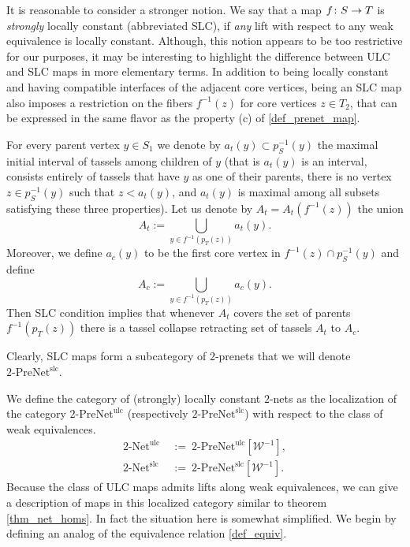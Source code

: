 \documentclass[letterpaper,12pt,leqno]{article}
\numberwithin{equation}{theorem}
\def\cW{\mathcal{W}}
\def\Net{\textrm{-}\mathrm{Net}}
\def\PreNet{\textrm{-}\mathrm{PreNet}}
\def\slc{\mathrm{slc}}
\def\ulc{\mathrm{ulc}}
\begin{document}
\begin{remark}
It is reasonable to consider a stronger notion. We say that a map $f\colon S \to T$ is {\em strongly} locally constant (abbreviated SLC), if {\em any} lift with respect to any weak equivalence
is locally constant. Although, this notion appears to be too restrictive for our purposes, it may be interesting to highlight the difference between ULC and SLC maps in more elementary terms.
In addition to being locally constant and having compatible interfaces of the adjacent core vertices, being an SLC map also imposes a restriction on the fibers $f^{-1}(z)$ for core vertices
$z \in T_2$, that can be expressed in the same flavor as the property (c) of \ref{def_prenet_map}.

For every parent vertex $y \in S_1$ we denote by $a_t(y) \subset p_S^{-1}(y)$ the maximal initial interval of tassels among children of $y$ (that is $a_t(y)$ is an interval, consists entirely
of tassels that have $y$ as one of their parents, there is no vertex $z \in p_S^{-1}(y)$ such that $z < a_t(y)$, and $a_t(y)$ is maximal among all subsets satisfying these three properties).
Let us denote by $A_t = A_t(f^{-1}(z))$ the union
$$
A_t := \bigcup_{y \in f^{-1}(p_T(z))} a_t(y).
$$
Moreover, we define $a_c(y)$ to be the first core vertex in $f^{-1}(z) \cap p_S^{-1}(y)$ and define
$$
A_c := \bigcup_{y \in f^{-1}(p_T(z))} a_c(y).
$$
Then SLC condition implies that whenever $A_t$ covers the set of parents $f^{-1}(p_T(z))$ there is a tassel collapse retracting set of tassels $A_t$ to $A_c$.

Clearly, SLC maps form a subcategory of $2$-prenets that we will denote $2\PreNet^\slc$.

\end{remark}

\begin{nparagraph}
We define the category of (strongly) locally constant $2$-nets as the localization of the category $2\PreNet^\ulc$ (respectively $2\PreNet^\slc$) with respect to the class of weak equivalences.
\begin{align*}
2\Net^\ulc \ &:=\ 2\PreNet^\ulc[\cW^{-1}], \\
2\Net^\slc \ &:=\ 2\PreNet^\slc[\cW^{-1}].
\end{align*}
Because the class of ULC maps admits lifts along weak equivalences, we can give a description of maps in this localized category similar to theorem \ref{thm_net_homs}. In fact
the situation here is somewhat simplified. We begin by defining an analog of the equivalence relation \ref{def_equiv}.
\end{nparagraph}
\end{document}

